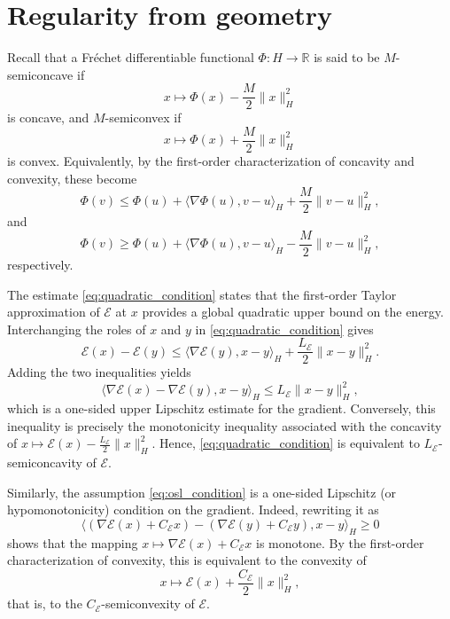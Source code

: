 \documentclass[12pt]{amsart}
\numberwithin{equation}{section}
\begin{document}
\appendix

\section{Regularity from geometry}\label{app:C11}

Recall that a Fr\'echet differentiable functional $\Phi:H\to\mathbb R$ is said to be $M$-semiconcave if
\[
x\longmapsto \Phi(x)-\frac{M}{2}\|x\|_H^2
\]
is concave, and $M$-semiconvex if
\[
x\longmapsto \Phi(x)+\frac{M}{2}\|x\|_H^2
\]
is convex. Equivalently, by the first-order characterization of concavity and convexity, these become 
\[
\Phi(v) \le \Phi(u) + \langle\nabla\Phi(u),v-u\rangle_H + \frac{M}{2}\|v-u\|_H^2,
\]
and
\[
\Phi(v) \ge \Phi(u) + \langle\nabla\Phi(u),v-u\rangle_H - \frac{M}{2}\|v-u\|_H^2,
\]
respectively.

The estimate \eqref{eq:quadratic_condition} states that the first-order Taylor approximation of $\mathscr{E}$ at $x$ provides a global quadratic upper bound on the energy. Interchanging the roles of $x$ and $y$ in \eqref{eq:quadratic_condition} gives
\[
\mathscr{E}(x)-\mathscr{E}(y) \le \langle\nabla\mathscr{E}(y),x-y\rangle_H +\frac{L_{\mathscr{E}}}{2}\|x-y\|_H^2.
\]
Adding the two inequalities yields
\[
\langle \nabla\mathscr{E}(x)-\nabla\mathscr{E}(y),
x-y \rangle_H \le L_{\mathscr{E}}\|x-y\|_H^2,
\]
which is a one-sided upper Lipschitz estimate for the gradient. Conversely, this inequality is precisely the monotonicity inequality associated with the concavity of $x\mapsto\mathscr{E}(x)-\frac{L_{\mathscr{E}}}{2}\|x\|_H^2$. Hence, \eqref{eq:quadratic_condition} is equivalent to $L_{\mathscr{E}}$-semiconcavity of $\mathscr{E}$.

Similarly, the assumption \eqref{eq:osl_condition} is a one-sided Lipschitz (or hypomonotonicity) condition on the gradient. Indeed, rewriting it as
\[
\langle (\nabla\mathscr{E}(x)+C_{\mathscr{E}}x) - (\nabla\mathscr{E}(y)+C_{\mathscr{E}}y), x-y \rangle_H \ge 0
\]
shows that the mapping $x\mapsto\nabla\mathscr{E}(x)+C_{\mathscr{E}}x$ is monotone. By the first-order characterization of convexity, this is equivalent to the convexity of
\[
x\longmapsto \mathscr{E}(x)+\frac{C_{\mathscr{E}}}{2}\|x\|_H^2,
\]
that is, to the $C_{\mathscr{E}}$-semiconvexity of $\mathscr{E}$.


\end{document}
